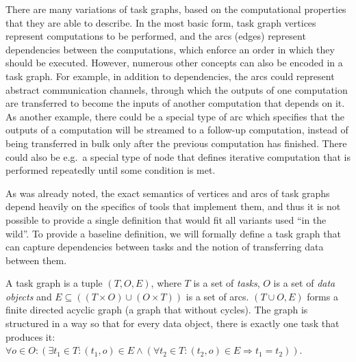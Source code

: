 There are many variations of task graphs, based on the computational properties that they are able
to describe. In the most basic form, task graph vertices represent computations to be performed,
and the arcs (edges) represent dependencies between the computations, which enforce an order in
which they should be executed. However, numerous other concepts can also be encoded in a task
graph. For example, in addition to dependencies, the arcs could represent abstract communication
channels, through which the outputs of one computation are transferred to become the inputs of
another computation that depends on it. As another example, there could be a special type of arc
which specifies that the outputs of a computation will be streamed to a follow-up computation,
instead of being transferred in bulk only after the previous computation has finished. There could
also be e.g.\ a special type of node that defines iterative computation that is performed
repeatedly until some condition is met.

As was already noted, the exact semantics of vertices and arcs of task graphs depend heavily on the
specifics of tools that implement them, and thus it is not possible to provide a single definition
that would fit all variants used ``in the wild''. To provide a baseline definition, we will
formally define a task graph that can capture dependencies between tasks and the notion of
transferring data between them.

\newcommand{\alltaskpairs}{\forall t_1\in{}T, \forall t_2\in{}T}

A task graph is a tuple $(T, O, E)$, where $T$ is a set of
\emph{tasks}, $O$ is a set of \emph{data objects} and
$E \subseteq ((T\times{}O) \cup (O\times{}T))$ is a set of arcs. $(T \cup O, E)$ forms a finite directed acyclic
graph (a graph that without cycles). The graph is structured in a way so that for every data
object, there is exactly one task that produces it: $\forall o\in{}O: (\exists t_1\in{}T: (t_1, o) \in E \land
	(\forall
	t_2\in{}T: (t_2, o) \in E \Rightarrow t_1 = t_2))$.

